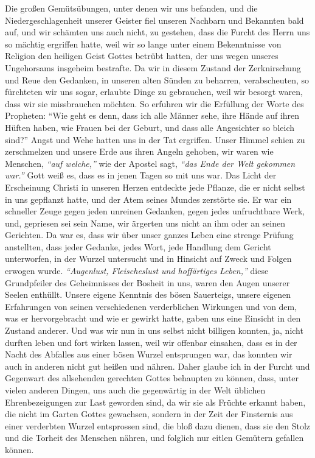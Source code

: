 Die großen Gemütsübungen, unter denen wir uns
befanden,
und die
Niedergeschlagenheit unserer Geister fiel unseren Nachbarn und Bekannten bald
auf, und wir schämten uns auch nicht, zu gestehen, dass die Furcht des Herrn uns
so mächtig ergriffen hatte, weil wir so lange unter einem Bekenntnisse von
Religion den heiligen Geist Gottes betrübt hatten, der uns wegen unseres
Ungehorsams insgeheim bestrafte. Da wir in
diesem
Zustand der Zerknirschung
und Reue den Gedanken, in unseren alten Sünden zu beharren, verabscheuten, so
fürchteten wir uns sogar, erlaubte Dinge zu gebrauchen, weil wir besorgt waren,
dass wir sie missbrauchen möchten. So erfuhren wir die Erfüllung der Worte des
Propheten:
"`Wie geht es denn, dass ich alle Männer sehe, ihre Hände auf ihren
Hüften haben, wie Frauen bei der Geburt, und dass alle Angesichter so bleich
sind?"'
Angst und Wehe hatten uns in der Tat ergriffen.
Unser Himmel schien zu zerschmelzen und unsere Erde aus ihren Angeln gehoben,
wir waren wie Menschen, \textit{"`auf welche,"'} wie der Apostel sagt,
\textit{"`das Ende der Welt gekommen war."'} Gott weiß es,
dass es in jenen Tagen so mit uns war. Das
Licht der Erscheinung Christi in unseren Herzen entdeckte jede Pflanze, die er
nicht selbst in uns gepflanzt hatte, und der Atem seines Mundes zerstörte sie.
Er war ein schneller Zeuge gegen jeden unreinen
Gedanken, gegen jedes
unfruchtbare Werk, und, gepriesen sei sein Name, wir ärgerten uns nicht an ihm
oder an seinen Gerichten. Da war es, dass wir über unser
ganzes Leben eine
strenge Prüfung anstellten, dass jeder
Gedanke, jedes Wort, jede Handlung dem
Gericht unterworfen, in der Wurzel untersucht und in Hinsicht auf Zweck und
Folgen erwogen wurde.
\textit{"`Augenlust, Fleischeslust und hoffärtiges Leben,"'}
diese Grundpfeiler des Geheimnisses der Bosheit
in uns, waren den Augen unserer Seelen enthüllt. Unsere eigene Kenntnis des
bösen Sauerteigs, unsere eigenen Erfahrungen von seinen
verschiedenen
verderblichen Wirkungen und von dem, was er hervorgebracht und wie er gewirkt
hatte, gaben uns eine Einsicht in den Zustand anderer. Und was wir nun in uns
selbst nicht billigen konnten, ja, nicht durften leben und fort wirken lassen,
weil
wir offenbar einsahen, dass es in der Nacht des Abfalles aus einer bösen Wurzel
entsprungen war, das konnten wir auch in anderen nicht gut heißen und nähren.
Daher glaube ich in der Furcht und Gegenwart des allsehenden gerechten Gottes
behaupten zu können, dass, unter vielen anderen Dingen, uns auch die gegenwärtig
in der Welt üblichen Ehrenbezeigungen zur Last geworden sind, da wir sie als
Früchte erkannt haben, die nicht im Garten Gottes
gewachsen, sondern in der Zeit
der Finsternis aus einer verderbten Wurzel
entsprossen sind, die bloß dazu
dienen, dass sie den Stolz und die Torheit des Menschen nähren, und folglich nur
eitlen Gemütern gefallen können.


